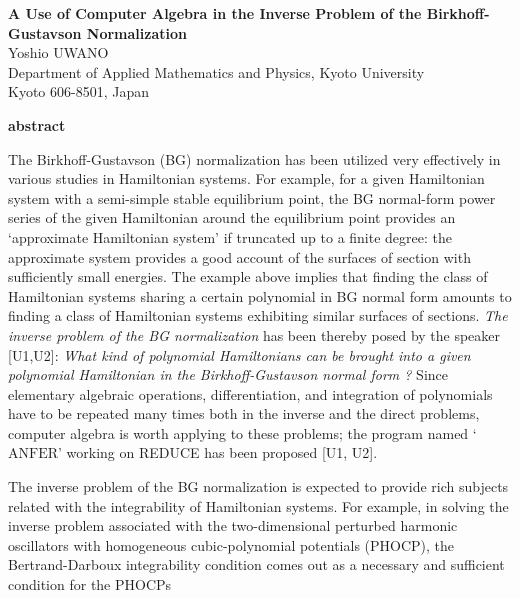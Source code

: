 \pagestyle{empty}
\parskip=2pt
\setlength{\textwidth}{160.mm}
\setlength{\textheight}{240.mm}
\setlength{\topmargin}{-15mm}
%

\begin{center}
{\large {\bf
A Use of Computer Algebra in the Inverse Problem of the
Birkhoff-Gustavson Normalization
}}
\\
\bigskip
Yoshio UWANO
\\
\medskip
Department of Applied Mathematics and Physics,
Kyoto University \\
Kyoto 606-8501, Japan
\end{center}
%
\smallskip
\begin{center}
{\bf abstract}
\end{center}
The Birkhoff-Gustavson (BG) normalization has been utilized
very effectively in various studies in Hamiltonian systems.
For example, for a given Hamiltonian system with a semi-simple
stable equilibrium point, the BG normal-form power series
of the given Hamiltonian around the equilibrium point
provides an \lq approximate Hamiltonian system' if truncated
up to a finite degree: the approximate system provides a
good account of the surfaces of section with sufficiently
small energies. The example above implies that finding the class
of Hamiltonian systems sharing a certain polynomial in BG normal
form amounts to finding a class of Hamiltonian systems exhibiting
similar surfaces of sections.
{\it The inverse problem of the BG normalization} has been
thereby posed by the speaker [U1,U2]:
{\it What kind of polynomial Hamiltonians can be brought into
a given polynomial Hamiltonian in the Birkhoff-Gustavson normal form ?}
Since elementary algebraic operations, differentiation, and integration
of polynomials have to be repeated many times both in the inverse and
the direct problems, computer algebra is worth applying to these problems;
the program named \lq $\mbox{ANFER}$' working on REDUCE has been
proposed [U1, U2].
\par
The inverse problem of the BG normalization is expected to
provide rich subjects related with the integrability of Hamiltonian systems.
For example, in solving the inverse problem associated with
the two-dimensional perturbed harmonic oscillators with homogeneous
cubic-polynomial potentials (PHOCP), the Bertrand-Darboux integrability
condition comes out as a necessary and sufficient condition for the PHOCPs
